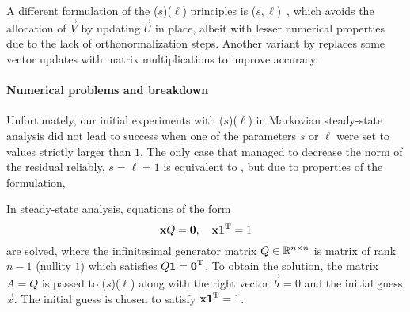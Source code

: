 A different formulation of the ($s$)($\ell$)
principles is ($s, \ell$)~\citep{tanio2010gbi},
which avoids the allocation of $\vec{V}$ by updating $\vec{U}$ in
place, albeit with lesser numerical properties due to the lack of
orthonormalization steps. Another variant by
\textcite{aihara2014variant} replaces some vector updates with matrix
multiplications to improve accuracy.

\paragraph{Numerical problems and breakdown}

Unfortunately, our initial experiments with
($s$)($\ell$) in Markovian steady-state
analysis did not lead to success when one of the parameters $s$ or
$\ell$ were set to values strictly larger than $1$. The only case that
managed to decrease the norm of the residual reliably, $s = \ell = 1$
is equivalent to , but due to properties of the
 formulation,

In steady-state analysis, equations of the form
\begin{equation}
  \label{eq:algorithms:idrstab:equation}
  \bm{\mathrm{x}} Q = \bm{\mathrm{0}}, \quad \bm{\mathrm{x}} \bm{\mathrm{1}}^{\mathrm{T}} = 1
\end{equation}
are solved, where the infinitesimal generator matrix
$Q \in \mathbb{R}^{n \times n}$ is matrix of rank $n - 1$ (nullity $1$) which
satisfies $Q \bm{\mathrm{1}} = \bm{\mathrm{0}}^{\mathrm{T}}$. To obtain the solution, the matrix
$A = Q$ is passed to ($s$)($\ell$) along with
the right vector $\vec{b} = 0$ and the initial guess $\vec{x}$. The
initial guess is chosen to satisfy $\bm{\mathrm{x}} \bm{\mathrm{1}}^{\mathrm{T}} = 1$.

